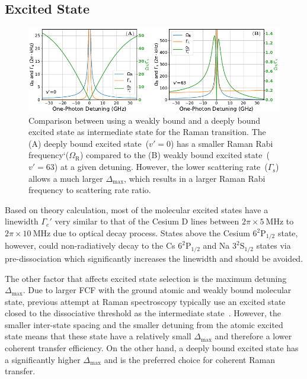 \subsection{Excited State}
\label{ch:raman-transfer:state-selction:ext}

\begin{figure}
  \centering
  \includegraphics[width=\textwidth]{figures/raman_transfer_v0_vs_v63.pdf}
  \caption[Comparison between using a weakly bound and a deeply bound excited state
  as intermediate state for the Raman transition]{
    Comparison between using a weakly bound and a deeply bound excited state
    as intermediate state for the Raman transition.
    The (A) deeply bound excited state~($v'=0$) has a smaller
    Raman Rabi frequency`($\Omega_{\mathrm{R}}$) compared to the
    (B) weakly bound excited state~($v'=63$) at a given detuning.
    However, the lower scattering rate~($\Gamma_{\mathrm{s}}$) allows a much larger
    $\Delta_{\max}$,
    which results in a larger Raman Rabi frequency to scattering rate ratio.
    \label{fig:raman-transfer:v0-vs-v63}}
\end{figure}

Based on theory calculation, most of the molecular excited states have a linewidth $\Gamma_e'$
very similar to that of the Cesium D lines between $2\pi\times5~\mathrm{MHz}$ to
$2\pi\times10~\mathrm{MHz}$ due to optical decay process.
States above the Cesium $\mathrm{6^2P_{1/2}}$ state,
however, could non-radiatively decay to the Cs $\mathrm{6^2P_{1/2}}$
and Na $\mathrm{3^2S_{1/2}}$ states
via pre-dissociation which significantly increases the linewidth and should be avoided.

The other factor that affects excited state selection is the maximum detuning $\Delta_{\max}$.
Due to larger FCF with the ground atomic and weakly bound molecular state,
previous attempt at Raman spectroscopy typically use an excited state
closed to the dissociative threshold as
the intermediate state~\cite{wynar_molecules_2000,rom_state_2004}.
However, the smaller inter-state spacing and the smaller detuning from
the atomic excited state means that these state have a relatively small $\Delta_{\max}$
and therefore a lower coherent transfer efficiency.
On the other hand, a deeply bound excited state has a significantly higher $\Delta_{\max}$
and is the preferred choice for coherent Raman transfer.

